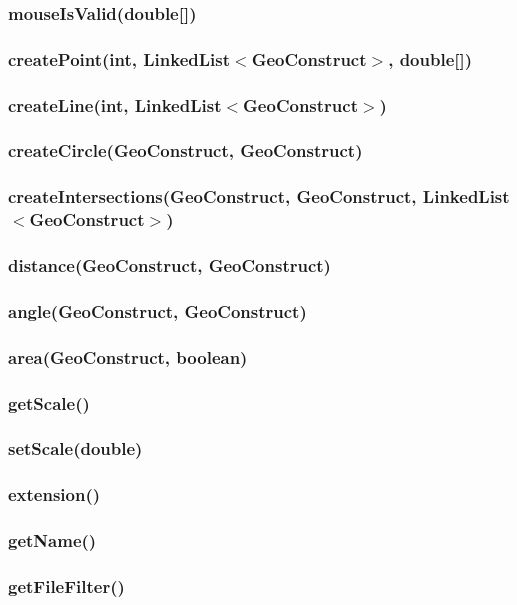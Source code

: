 \documentclass[a4paper,10pt]{report}
\begin{document}
\subsubsection{mouseIsValid(double[])}
\subsubsection{createPoint(int, LinkedList$<$GeoConstruct$>$, double[])}
\subsubsection{createLine(int, LinkedList$<$GeoConstruct$>$)}
\subsubsection{createCircle(GeoConstruct, GeoConstruct)}
\subsubsection{createIntersections(GeoConstruct, GeoConstruct, LinkedList$<$GeoConstruct$>$)}
\subsubsection{distance(GeoConstruct, GeoConstruct)}
\subsubsection{angle(GeoConstruct, GeoConstruct)}
\subsubsection{area(GeoConstruct, boolean)}
\subsubsection{getScale()}
\subsubsection{setScale(double)}
\subsubsection{extension()}
\subsubsection{getName()}
\subsubsection{getFileFilter()}
\end{document}
